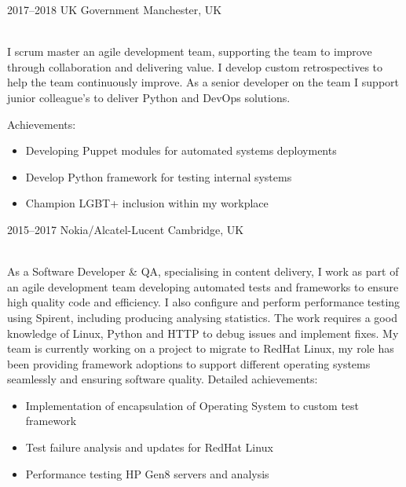 \documentclass[]{cv-style}          %
\begin{document}
\begin{entrylist}
\entry
  {2017--2018}
  {UK Government}
  {Manchester, UK}
  {\\
  I scrum master an agile development team, supporting the team to improve through collaboration and delivering value.
  I develop custom retrospectives to help the team continuously improve.
  As a senior developer on the team I support junior colleague's to deliver Python and DevOps solutions.

Achievements:
\begin{itemize}
  \item Developing Puppet modules for automated systems deployments
  \item Develop Python framework for testing internal systems
  \item Champion LGBT+ inclusion within my workplace
\end{itemize}
}

\entry
  {2015--2017}
  {Nokia/Alcatel-Lucent}
  {Cambridge, UK}
  {\\
As a Software Developer \& QA, specialising in content delivery, I work as part of an agile development team developing automated tests and frameworks to ensure high quality code and efficiency. I also configure and perform performance testing using Spirent, including producing analysing statistics. The work requires a good knowledge of Linux, Python and HTTP to debug issues and implement fixes. My team is currently working on a project to migrate to RedHat Linux, my role has been providing framework adoptions to support different operating systems seamlessly and ensuring software quality.
Detailed achievements:
\begin{itemize}
  \item Implementation of encapsulation of Operating System to custom test framework
  \item Test failure analysis and updates for RedHat Linux
  \item Performance testing HP Gen8 servers and analysis
\end{itemize}
}
\end{entrylist}
\end{document}
